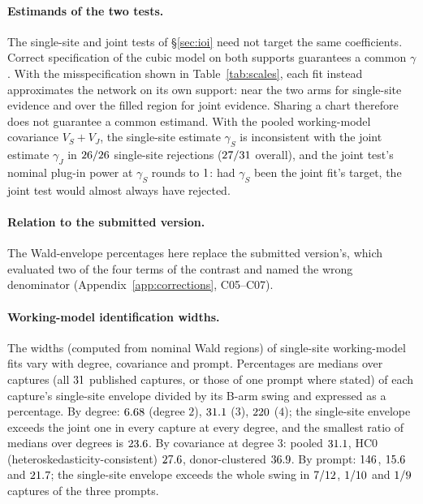 \paragraph{Estimands of the two tests.} The single-site and joint tests of \S\ref{sec:ioi} need not target the same
coefficients. Correct specification of the cubic model on both supports guarantees a common $\gamma$. With the
misspecification shown in Table~\ref{tab:scales}, each fit instead approximates the network on its own support: near the
two arms for single-site evidence and over the filled region for joint evidence. Sharing a chart therefore does not
guarantee a common estimand. With the pooled working-model covariance $V_S+V_J$, the single-site estimate $\gamma_S$ is
inconsistent with the joint estimate $\gamma_J$ in $26/26$ single-site rejections ($27/31$
overall), and the joint test's nominal plug-in power at $\gamma_S$ rounds to $1$: had $\gamma_S$ been the joint
fit's target, the joint test would almost always have rejected.

\paragraph{Relation to the submitted version.} The Wald-envelope percentages here replace the submitted version's, which
evaluated two of the four terms of the contrast and named the wrong denominator (Appendix~\ref{app:corrections},
C05--C07).

\paragraph{Working-model identification widths.} The widths (computed from nominal Wald regions) of single-site working-model fits vary with degree, covariance and prompt.
Percentages are medians over captures (all $31$ published captures, or those of one prompt where stated)
of each capture's single-site envelope divided by its B-arm swing and expressed as a percentage. By degree: $6.68$ (degree $2$), $31.1$ ($3$), $220$ ($4$); the single-site
envelope exceeds the joint one in every capture at every degree, and the smallest ratio of medians over degrees is
$23.6$. By covariance at degree $3$: pooled $31.1$, HC0 (heteroskedasticity-consistent) $27.6$,
donor-clustered $36.9$. By prompt: $146$, $15.6$ and $21.7$; the
single-site envelope exceeds the whole swing in $7/12$, $1/10$ and $1/9$
captures of the three prompts.

